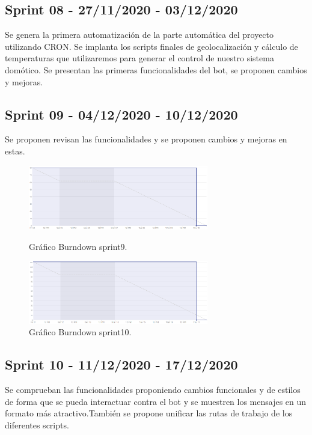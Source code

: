 \subsection{Sprint 08 - 27/11/2020 - 03/12/2020}
Se genera la primera automatización de la parte automática del proyecto utilizando CRON.
Se implanta los scripts finales de geolocalización y cálculo de temperaturas que utilizaremos para generar el control de nuestro sistema domótico.
Se presentan las primeras funcionalidades del bot, se proponen cambios y mejoras.


\subsection{Sprint 09 - 04/12/2020 - 10/12/2020}
Se proponen revisan las funcionalidades y se proponen cambios y mejoras en estas. 

\begin{figure}
    \centering
    \includegraphics[width=0.7\textwidth]{img/BurnDown/9.PNG}
    \caption{Gráfico Burndown sprint9. } \label{BD9}
    \includegraphics[width=0.7\textwidth]{img/BurnDown/10.PNG}
    \caption{Gráfico Burndown sprint10. } \label{BD10}
\end{figure}

\subsection{Sprint 10 - 11/12/2020 - 17/12/2020}
Se comprueban las funcionalidades proponiendo cambios funcionales y de estilos de forma que se pueda interactuar contra el bot y se muestren los mensajes en un formato más atractivo.También se propone unificar las rutas de trabajo de los diferentes scripts.




